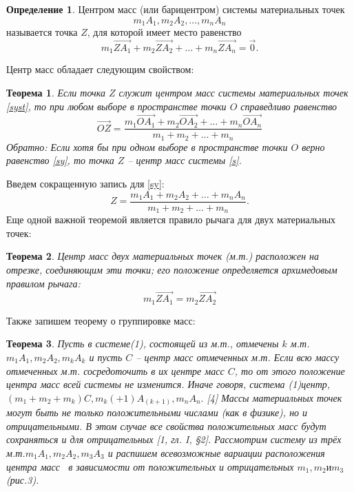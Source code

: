 \documentclass[a4paper,12pt]{article}
\theoremstyle{plain} %
\numberwithin{equation}{section}
\newtheorem{theorem}{Теорема}[section]
\theoremstyle{definition} %
\newtheorem{defn}{Определение}[section]
\theoremstyle{remark} %
\renewcommand{\dfrac}[2]{\displaystyle\frac{#1}{#2}}
\begin{document}
\begin{defn}  Центром масс (или барицентром) системы материальных точек
\begin{equation}\label{syst}
m_1 A_1,m_2 A_2,…,m_n A_n
\end{equation}
называется точка $Z$, для которой имеет место равенство 
\begin{equation}\label{s}
m_1 \overrightarrow{ZA_1}+m_2\overrightarrow{ZA_2}+\ldots+m_n \overrightarrow{ZA_n}=\overrightarrow{0}.
\end{equation}                 
\end{defn}
Центр масс обладает следующим свойством: 
\begin{theorem} Если точка $Z$ служит центром масс системы материальных точек \eqref{syst}, то при любом выборе в пространстве точки $O$ справедливо равенство 
\begin{equation}\label{sy}
    \overrightarrow{OZ}=\dfrac{m_1\overrightarrow{OA_1}+ m_2\overrightarrow{OA_2} +\ldots+m_n\overrightarrow{OA_n}}{m_1+m_2+\ldots+m_n }
\end{equation}
Обратно: 
Если хотя бы при одном выборе в пространстве точки $O$ верно равенство \eqref{sy}, то точка $Z$ -- центр масс системы \eqref{s}.
\end{theorem}
Введем сокращенную запись для \eqref{sy}:  $$Z=\dfrac{m_1A_1+ m_2A_2 +\ldots+ m_nA_n}{m_1+m_2+\ldots+m_n}.$$
Еще одной важной теоремой является правило рычага для двух материальных точек: 
\begin{theorem} Центр масс двух материальных точек (м.т.) расположен на отрезке, соединяющим эти точки; его положение определяется архимедовым правилом рычага: $$m_1\overrightarrow{ZA_1}=m_2\overrightarrow{ZA_2}$$
\end{theorem}
Также запишем теорему о группировке масс: 
\begin{theorem} Пусть в системе(1), состоящей из м.т., отмечены $k$ м.т.$m_1 A_1,m_2 A_2,m_k A_k$ и пусть $C$ – центр масс отмеченных м.т. Если всю массу отмеченных м.т. сосредоточить в их центре масс $C$, то от этого положение центра масс всей системы не изменится. Иначе говоря, система (1)центр, $(m_1+m_2+m_k )C,m_k(+1) A_(k+1) ,m_n A_n. $  [4] 
Массы материальных точек могут быть не только положительными числами (как в физике), но и отрицательными. В этом случае все свойства положительных масс будут сохраняться и для отрицательных [1, гл. I, §2]. 
Рассмотрим систему из трёх м.т.$m_1 A_1,m_2 A_2,m_3 A_3$ и распишем всевозможные вариации расположения центра масс~\cite{Kirsanov20112014Oct} в зависимости от положительных и отрицательных $m_1,m_2 и m_3$ (рис.3).
\end{theorem}
\newpage
\end{document}

